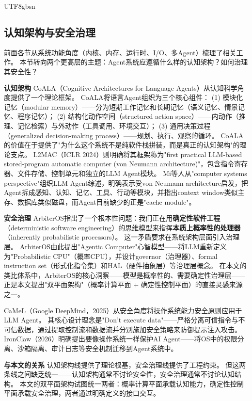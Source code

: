 \documentclass[11pt,a4paper]{article}
\begin{document}
\begin{CJK*}{UTF8}{gbsn}
\subsection{认知架构与安全治理}
\label{sec:related-cognition-security}

前面各节从系统功能角度（内核、内存、运行时、I/O、多Agent）梳理了相关工作。
本节转向两个更高层的主题：Agent系统应遵循什么样的认知架构？如何治理其安全性？

\textbf{认知架构}
CoALA（Cognitive Architectures for Language Agents）\cite{sumers2024coala}从认知科学角度提供了一个理论框架。
CoALA将语言Agent组织为三个核心组件：
(1) 模块化记忆（modular memory）——分为短期工作记忆和长期记忆（语义记忆、情景记忆、程序记忆）；
(2) 结构化动作空间（structured action space）——内动作（推理、记忆检索）与外动作（工具调用、环境交互）；
(3) 通用决策过程（generalized decision-making process）——规划、执行、观察的循环。
CoALA的价值在于提供了"为什么这个系统不是纯软件栈拼装，而是真正的认知架构"的理论支点。
L2MAC\cite{holt2024l2mac}（ICLR 2024）则明确将其框架称为"first practical LLM-based stored-program automatic computer (von Neumann architecture)"，包含指令寄存器、文件存储、控制单元和独立的LLM Agent模块。
Mi等人\cite{mi2025llmagentscomputersystems}从"computer systems perspective"组织LLM Agent综述，明确表示受von Neumann architecture启发，把Agent拆成感知、认知、记忆、工具、行动等模块，并指出context window类似主存、数据库类似磁盘，而Agent目前缺少的正是"cache module"。

\textbf{安全治理}
ArbiterOS\cite{arbiteros2025}指出了一个根本性问题：我们正在用\textbf{确定性软件工程}（deterministic software engineering）的思维模型来指挥\textbf{本质上概率性的处理器}（inherently probabilistic processors）。
这一矛盾要求在系统架构层面引入治理层。
ArbiterOS由此提出"Agentic Computer"心智模型——将LLM重新定义为"Probabilistic CPU"（概率CPU），并设计governor（治理器）、formal instruction set（形式化指令集）和HAL（硬件抽象层）等治理层概念。
在本文的类比体系中，ArbiterOS的核心洞察——模型是概率性的、需要确定性治理层——正是本文提出"双平面架构"（概率计算平面 + 确定性控制平面）的直接灵感来源之一。

CaMeL\cite{debenedetti2025camel}（Google DeepMind，2025）从安全角度将操作系统能力安全原则应用于LLM Agent。
其核心设计理念是"Don't execute data"——严格分离可信指令与不可信数据，通过提取控制流和数据流并分别施加安全策略来防御提示注入攻击。
IronClaw\cite{ironclaw2025}（2026）明确提出要像操作系统一样保护AI Agent——将OS中的权限分离、沙箱隔离、审计日志等安全机制迁移到Agent系统中。

\textbf{与本文的关系}
认知架构线提供了理论根基，安全治理线提供了工程约束。
但这两条线之间缺乏统一——认知架构通常不讨论安全性，安全治理通常不讨论认知结构。
本文的双平面架构试图统一两者：概率计算平面承载认知能力，确定性控制平面承载安全治理，两者通过明确定义的接口交互。


\end{CJK*}
\end{document}
